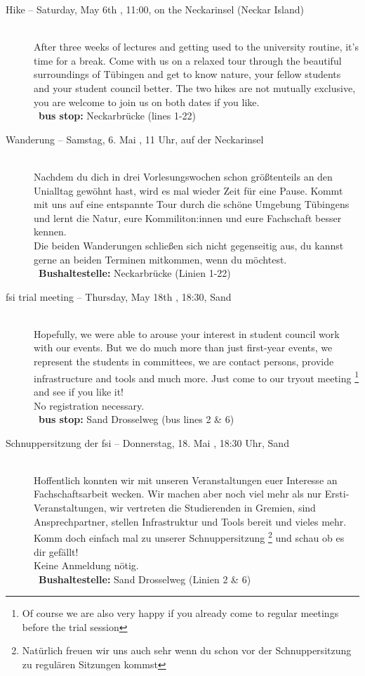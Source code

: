 \begin{description}
\ifbinfo \ifmaster \pagebreak \fi \fi

\ifml
	\item[Hike -- Saturday, May 6th \YEAR, 11:00, on the Neckarinsel (Neckar Island)]~\\
	After three weeks of lectures and getting used to the university routine, it's time for a break.
	Come with us on a relaxed tour through the beautiful surroundings of Tübingen and get to know nature, your fellow students and your student council better.
	The two hikes are not mutually exclusive, you are welcome to join us on both dates if you like.\\
	~\textbf{bus stop:} Neckarbrücke (lines 1-22)
\else
	\item[Wanderung -- Samstag, 6. Mai \YEAR, 11 Uhr, auf der Neckarinsel]~\\
	Nachdem du dich in drei Vorlesungswochen schon größtenteils an den Unialltag gewöhnt hast, wird es mal wieder Zeit für eine Pause.
	Kommt mit uns auf eine entspannte Tour durch die schöne Umgebung Tübingens und lernt die Natur, eure Kommiliton:innen und eure Fachschaft besser kennen.\\
	Die beiden Wanderungen schließen sich nicht gegenseitig aus, du kannst gerne an beiden Terminen mitkommen, wenn du möchtest.\\
	~\textbf{Bushaltestelle:} Neckarbrücke (Linien 1-22)
\fi

\ifml
	\item[fsi trial meeting -- Thursday, May 18th \YEAR, 18:30, Sand]~\\
	Hopefully, we were able to arouse your interest in student council work with our events.
	But we do much more than just first-year events, we represent the students in committees,
	we are contact persons, provide infrastructure and tools and much more.
	Just come to our tryout meeting
	\footnote{Of course we are also very happy if you already come to regular meetings before the trial session}
	and see if you like it!\\
	No registration necessary.\\
	~\textbf{bus stop:} Sand Drosselweg (bus lines 2 \& 6)
\else
	\item[Schnuppersitzung der fsi -- Donnerstag, 18. Mai \YEAR, 18:30 Uhr, Sand]~\\
	Hoffentlich konnten wir mit unseren Veranstaltungen euer Interesse an Fachschaftsarbeit wecken.
	Wir machen aber noch viel mehr als nur Ersti-Veranstaltungen, wir vertreten die Studierenden in Gremien,
	sind Ansprechpartner, stellen Infrastruktur und Tools bereit und vieles mehr.
	Komm doch einfach mal zu unserer Schnuppersitzung
	\footnote{Natürlich freuen wir uns auch sehr wenn du schon vor der Schnuppersitzung zu regulären Sitzungen kommst}
	und schau ob es dir gefällt!\\
	Keine Anmeldung nötig.\\
	~\textbf{Bushaltestelle:} Sand Drosselweg (Linien 2 \& 6)
\fi


\end{description}

